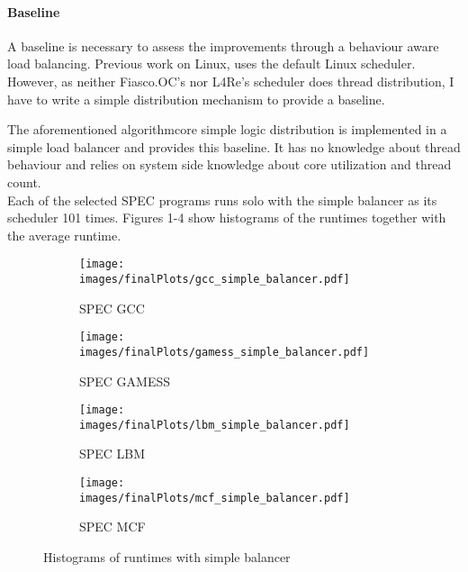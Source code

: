 
\paragraph{Baseline}

A baseline is necessary to assess the improvements through a behaviour aware
load balancing.
Previous work on Linux, uses the default Linux scheduler.
However, as neither Fiasco.OC's nor L4Re's scheduler does thread distribution,
I have to write a simple distribution mechanism to provide a baseline.

The aforementioned algorithmcore simple logic distribution is implemented in a
simple load balancer and provides this baseline.
It has no knowledge about thread behaviour and relies on system side
knowledge about core utilization and thread count.
\\

Each of the selected SPEC programs runs solo with the simple balancer as its
scheduler 101 times.
Figures 1-4 show histograms of the runtimes together with the average runtime.

\begin{figure}[h!]
  \begin{subfigure}{.49\textwidth}
    \texttt{[image: images/finalPlots/gcc\_simple\_balancer.pdf]}
    \caption{SPEC GCC}
    \label{baseline:gcc}
  \end{subfigure}
  \begin{subfigure}{.49\textwidth}
    \texttt{[image: images/finalPlots/gamess\_simple\_balancer.pdf]}
    \caption{SPEC GAMESS}
    \label{baseline:gamess}
  \end{subfigure}
  \begin{subfigure}{.49\textwidth}
    \texttt{[image: images/finalPlots/lbm\_simple\_balancer.pdf]}
    \caption{SPEC LBM}
    \label{baseline:gcc}
  \end{subfigure}
  \begin{subfigure}{.49\textwidth}
    \texttt{[image: images/finalPlots/mcf\_simple\_balancer.pdf]}
    \caption{SPEC MCF}
    \label{baseline:gamess}
  \end{subfigure}
  \caption{Histograms of runtimes with simple balancer}
\end{figure}
